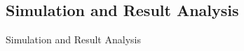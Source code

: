 \documentclass[10pt, compress]{beamer}
\begin{document}
\subsection{Simulation and Result Analysis}
\begin{frame}{Simulation and Result Analysis}
\end{frame}

%
%
\end{document}
